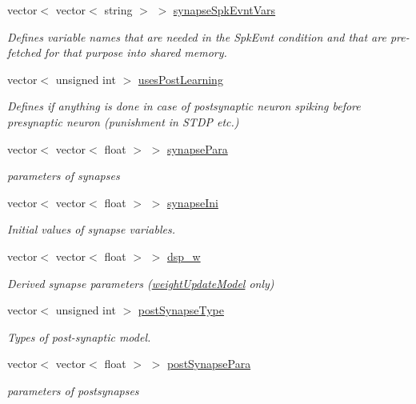\begin{DoxyCompactItemize}
vector$<$ vector$<$ string $>$ $>$ \hyperlink{classNNmodel_a30e4ebc1109de5e7d921b22f1597cbf4}{synapse\+Spk\+Evnt\+Vars}
\begin{DoxyCompactList}\small\item\em Defines variable names that are needed in the Spk\+Evnt condition and that are pre-\/fetched for that purpose into shared memory. \end{DoxyCompactList}\item 
vector$<$ unsigned int $>$ \hyperlink{classNNmodel_a81fb25a9fab59e840ef622d469747d69}{uses\+Post\+Learning}
\begin{DoxyCompactList}\small\item\em Defines if anything is done in case of postsynaptic neuron spiking before presynaptic neuron (punishment in S\+T\+D\+P etc.) \end{DoxyCompactList}\item 
vector$<$ vector$<$ float $>$ $>$ \hyperlink{classNNmodel_a65795cabef5f0d1f75e8c08530750d0e}{synapse\+Para}
\begin{DoxyCompactList}\small\item\em parameters of synapses \end{DoxyCompactList}\item 
vector$<$ vector$<$ float $>$ $>$ \hyperlink{classNNmodel_a0b82703b2b3726e86116767f2bc0c422}{synapse\+Ini}
\begin{DoxyCompactList}\small\item\em Initial values of synapse variables. \end{DoxyCompactList}\item 
vector$<$ vector$<$ float $>$ $>$ \hyperlink{classNNmodel_aeb5fa229c8032952feb3440e055f6a85}{dsp\+\_\+w}
\begin{DoxyCompactList}\small\item\em Derived synapse parameters (\hyperlink{classweightUpdateModel}{weight\+Update\+Model} only) \end{DoxyCompactList}\item 
vector$<$ unsigned int $>$ \hyperlink{classNNmodel_a4fc23591415ddac76d1d92ab68c018c9}{post\+Synapse\+Type}
\begin{DoxyCompactList}\small\item\em Types of post-\/synaptic model. \end{DoxyCompactList}\item 
vector$<$ vector$<$ float $>$ $>$ \hyperlink{classNNmodel_a3b9431104ee496ed084ab549ebf2de10}{post\+Synapse\+Para}
\begin{DoxyCompactList}\small\item\em parameters of postsynapses \end{DoxyCompactList}\item 

\end{DoxyCompactItemize}

